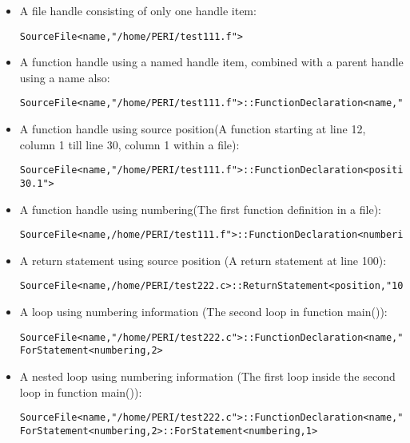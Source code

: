 \begin{itemize}
\item A file handle consisting of only one handle item: 
\begin{verbatim}
SourceFile<name,"/home/PERI/test111.f">
\end{verbatim}

\item A function handle using a named handle item, combined with a parent handle using a name also: 

\begin{verbatim}
SourceFile<name,"/home/PERI/test111.f">::FunctionDeclaration<name,"foo">
\end{verbatim}

\item A function handle using source position(A function starting at line 12, column 1 till line 30, column 1 within a file): 

\begin{verbatim}
SourceFile<name,"/home/PERI/test111.f">::FunctionDeclaration<position,"12.1-30.1">

\end{verbatim}
\item A function handle using numbering(The first function definition in a file): 
\begin{verbatim}
SourceFile<name,/home/PERI/test111.f">::FunctionDeclaration<numbering,1>
\end{verbatim}
\item A return statement using source position (A return statement at line 100):
\begin{verbatim}
SourceFile<name,/home/PERI/test222.c>::ReturnStatement<position,"100">

\end{verbatim}
\item A loop using numbering information (The second loop in function
main()): 
\begin{verbatim}
SourceFile<name,"/home/PERI/test222.c">::FunctionDeclaration<name,"main">::
ForStatement<numbering,2>
\end{verbatim}
\item A nested loop using numbering information (The first loop inside the second loop in function
main()): 
\begin{verbatim}
SourceFile<name,"/home/PERI/test222.c">::FunctionDeclaration<name,"main">::
ForStatement<numbering,2>::ForStatement<numbering,1>
\end{verbatim}

\end{itemize}

